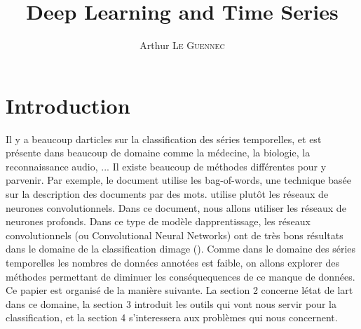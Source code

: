 \documentclass[11pt]{sdm}
\title{Deep Learning and Time Series}
\author{Arthur \textsc{Le Guennec}}
\begin{document}
\maketitle


\section{Introduction}

Il y a beaucoup d\textquotesingle articles sur la classification des s\'eries temporelles, et est pr\'esente dans beaucoup de domaine comme la m\'edecine, la biologie, la reconnaissance audio, ... Il existe beaucoup de m\'ethodes diff\'erentes pour y parvenir. Par exemple, le document \cite{bailly2015bag} utilise les bag-of-words, une technique bas\'ee sur la description des documents par des mots. \cite{zheng2014time} utilise plut\^ot les r\'eseaux de neurones convolutionnels.
Dans ce document, nous allons utiliser les r\'eseaux de neurones profonds. Dans ce type de mod\`ele d\textquotesingle apprentissage, les r\'eseaux convolutionnels (ou Convolutional Neural Networks) ont de tr\`es bons r\'esultats dans le domaine de la classification d\textquotesingle image (\cite{chatfield2014return}).
Comme dans le domaine des s\'eries temporelles les nombres de donn\'ees annot\'ees est faible, on allons explorer des m\'ethodes permettant de diminuer les cons\'equequences de ce manque de donn\'ees. \\
Ce papier est organis\'e de la mani\`ere suivante. La section 2 concerne l\textquotesingle \'etat de l\textquotesingle art dans ce domaine, la section 3 introduit les outils qui vont nous servir pour la classification, et la section 4 s'interessera aux probl\`emes qui nous concernent.

 
\end{document}
